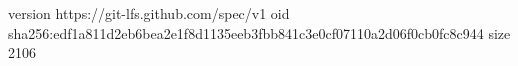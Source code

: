 version https://git-lfs.github.com/spec/v1
oid sha256:edf1a811d2eb6bea2e1f8d1135eeb3fbb841c3e0cf07110a2d06f0cb0fc8c944
size 2106

